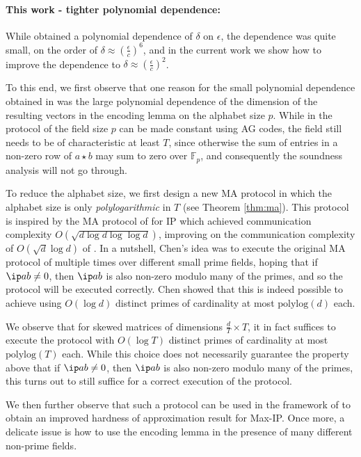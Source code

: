 \documentclass[11pt]{article}
\theoremstyle{plain}
\theoremstyle{remark}
\newcommand{\F}{\mathbb{F}}
\newcommand{\polylog}{\mathrm{polylog}}
\begin{document}
\paragraph{This work - tighter polynomial dependence:} While \cite{CW19} obtained a polynomial dependence of $\delta$ on $\epsilon$, the dependence was quite small, on the order of $\delta \approx  (\frac \epsilon c)^6$, and in the current work we show how to improve the dependence to $\delta \approx (\frac  \epsilon c)^2$.

To this end, we first observe that one reason for the small polynomial dependence obtained in \cite{CW19} was the large polynomial dependence of the dimension of the resulting vectors in the encoding lemma on the alphabet size $p$. While in the protocol of \cite{Rub18} the field size $p$ can be made constant using AG codes, the field still needs to be of characteristic at least $T$, since otherwise the sum of entries in a non-zero row of $a \star b$ may sum to zero over $\F_p$, and consequently the soundness analysis will not go through.

To reduce the alphabet size, we first design a new MA protocol in which the alphabet size is only \emph{polylogarithmic} in $T$ (see Theorem \ref{thm:ma}).
This protocol is inspired by the MA protocol of \cite{Che18} for IP which achieved communication complexity $O(\sqrt{d \log d\log \log d})$, improving on the communication complexity of $O(\sqrt{d} \log d)$ of \cite{AW09}.
In a nutshell, Chen's idea was to execute the original MA protocol of  \cite{AW09} multiple times over different small prime fields, hoping that if $\ip a b \neq 0$, then $\ip a b$ is also non-zero modulo many of the primes, and so the protocol will be executed correctly.
Chen showed that this is indeed possible to achieve using $O(\log d)$ distinct primes of cardinality at most $\polylog(d)$ each.

We observe that for skewed matrices of  dimensions $\frac d T \times T$, it in fact suffices to execute the protocol with $O(\log T)$ distinct primes of cardinality at most $\polylog(T)$ each. While this choice does not necessarily guarantee the property above that if $\ip a b \neq 0$, then $\ip a b$ is also non-zero modulo many of the primes, this turns out to still suffice for a correct execution of the protocol. 

We then further observe that such a protocol can be used in the framework of \cite{CW19} to obtain an improved hardness of approximation result for Max-IP. Once more, a delicate issue is how to use the encoding lemma in the presence of many different non-prime fields.   
\end{document}
